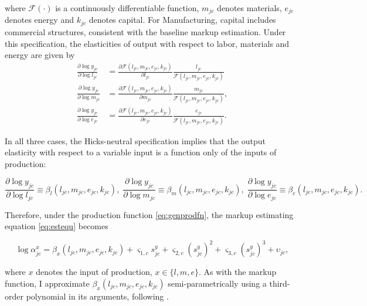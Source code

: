 where $\mathcal{F}\left(\cdot\right)$ is a continuously differentiable function, $m_{jc}$ denotes materials, $e_{jc}$ denotes energy and $k_{jc}$ denotes capital. For Manufacturing, capital includes commercial structures, consistent with the baseline markup estimation. Under this specification, the elasticities of output with respect to labor, materials and energy are given by
\begin{align*}
	\frac{\partial \log y_{jc}}{\partial \log l_{jc}} & = \frac{\partial \mathcal{F}\left(l_{jc}, m_{jc}, e_{jc}, k_{jc} \right)}{\partial l_{jc}} \frac{l_{jc}}{\mathcal{F}\left(l_{jc}, m_{jc}, e_{jc}, k_{jc} \right)} \\
	\frac{\partial \log y_{jc}}{\partial \log m_{jc}} & = \frac{\partial \mathcal{F}\left(l_{jc}, m_{jc}, e_{jc}, k_{jc} \right)}{\partial m_{jc}} \frac{m_{jc}}{\mathcal{F}\left(l_{jc}, m_{jc}, e_{jc}, k_{jc} \right)}, \\
	\frac{\partial \log y_{jc}}{\partial \log e_{jc}} & = \frac{\partial \mathcal{F}\left(l_{jc}, m_{jc}, e_{jc}, k_{jc} \right)}{\partial e_{jc}} \frac{e_{jc}}{\mathcal{F}\left(l_{jc}, m_{jc}, e_{jc}, k_{jc} \right)}.
\end{align*}	

In all three cases, the Hicks-neutral specification implies that the output elasticity with respect to a variable input is a function only of the inputs of production:

\begin{equation*}
	\frac{\partial \log y_{jc}}{\partial \log l_{jc}} \equiv \beta_l\left(l_{jc}, m_{jc}, e_{jc}, k_{jc} \right), \;
	\frac{\partial \log y_{jc}}{\partial \log m_{jc}} \equiv \beta_m\left(l_{jc}, m_{jc}, e_{jc}, k_{jc} \right), \;
	\frac{\partial \log y_{jc}}{\partial \log e_{jc}} \equiv \beta_e\left(l_{jc}, m_{jc}, e_{jc}, k_{jc} \right).
\end{equation*}	

Therefore, under the production function \eqref{eq:genprodfn}, the markup estimating equation \eqref{eq:estequ} becomes

\begin{equation}\label{eq:estequgenf}
\log \alpha_{jc}^x = \beta_x\left(l_{jc}, m_{jc}, e_{jc}, k_{jc} \right) + \varsigma_{1,c} s^y_{jc} + \varsigma_{2,c} \left(s^y_{jc}\right)^2 + \varsigma_{3,c} \left(s^y_{jc}\right)^3 + \upsilon_{jc},
\end{equation}

where $x$ denotes the input of production, $x \in \{l,m,e\}$. As with the markup function, I approximate $\beta_x\left(l_{jc}, m_{jc}, e_{jc}, k_{jc} \right)$ semi-parametrically using a third-order polynomial in its arguments, following \textcite{GandhiNavarro&Rivers20}.

